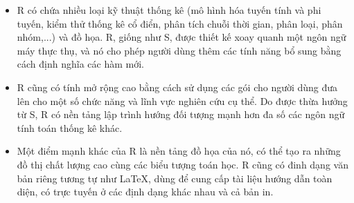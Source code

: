 \documentclass[a4paper]{article}
\theoremstyle{definition}
\begin{document}
\begin{itemize}
    \item R có chứa nhiều loại kỹ thuật thống kê (mô hình hóa tuyến tính và phi tuyến, kiểm thử thống kê cổ điển, phân tích chuỗi thời gian, phân loại, phân nhóm,...) và đồ họa. R, giống như S, được thiết kế xoay quanh một ngôn ngữ máy thực thụ, và nó cho phép người dùng thêm các tính năng bổ sung bằng cách định nghĩa các hàm mới. 
    
    \item R cũng có tính mở rộng cao bằng cách sử dụng các gói cho người dùng đưa lên cho một số chức năng và lĩnh vực nghiên cứu cụ thể. Do được thừa hưởng từ S, R có nền tảng lập trình hướng đối tượng mạnh hơn đa số các ngôn ngữ tính toán thống kê khác.
    
    \item Một điểm mạnh khác của R là nền tảng đồ họa của nó, có thể tạo ra những đồ thị chất lượng cao cùng các biểu tượng toán học. R cũng có đinh dạng văn bản riêng tương tự như LaTeX, dùng để cung cấp tài liệu hướng dẫn toàn diện, có trực tuyến ở các định dạng khác nhau và cả bản in.
\end{itemize}
\end{document}
